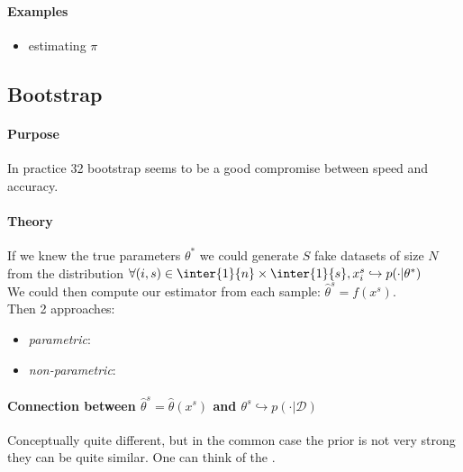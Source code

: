 \paragraph{Examples}
\begin{itemize}
    \item estimating $\pi$
\end{itemize}

\subsection{Bootstrap}
\paragraph{Purpose}
In practice 32 bootstrap seems to be a good compromise between speed and accuracy.\\
\paragraph{Theory}
If we knew the true parameters $\theta^{*}$ we could generate $S$ fake datasets of size
$N$ from the distribution $\forall (i,s)\in\inter{1}{n}\times\inter{1}{s}, x^{s}_{i}
\hookrightarrow p(\cdot|\theta^{*})$\\
We could then compute our estimator from each sample: $\hat{\theta}^{s} = f(x^{s})$.\\
Then 2 approaches:
\begin{itemize}
    \item \emph{parametric}: 
    \item \emph{non-parametric}: \end{itemize}

\paragraph{Connection between $\hat{\theta}^{s} = \hat{\theta}(x^{s})$ and $\theta^{s}
\hookrightarrow p(\cdot|\mathcal{D})$}
Conceptually quite different, but in the common case the prior is not very strong
they can be quite similar. 
One can think of the .


